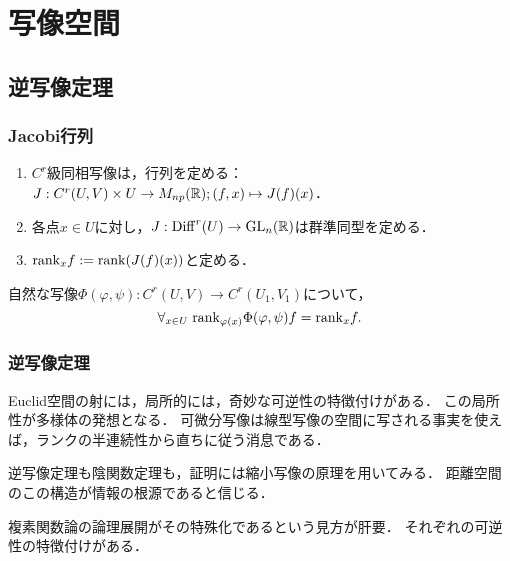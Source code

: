 \documentclass[uplatex,dvipdfmx]{jsreport}
\begin{document}
\chapter{写像空間}

\section{逆写像定理}

\subsection{Jacobi行列}

\begin{definition}[Jacobi行列]\mbox{}
    \begin{enumerate}
        \item $C^r$級同相写像は，行列を定める：$J:C^r(U,V)\times U\to M_{np}(\mathbb{R});(f,x)\mapsto J(f)(x)$．
        \item 各点$x\in U$に対し，$J:\mathrm{Diff}^r(U)\to\mathrm{GL}_n(\mathbb{R})$は群準同型を定める．
        \item $\mathrm{rank}_xf:=\mathrm{rank}(J(f)(x))$と定める．
    \end{enumerate}
\end{definition}

\begin{lemma}
    自然な写像$\Phi(\varphi,\psi):C^r(U,V)\to C^r(U_1,V_1)$について，
    \[\forall_{x\in U}\;\mathrm{rank}_{\varphi(x)}\Phi(\varphi,\psi)f=\mathrm{rank}_xf.\]
\end{lemma}

\subsection{逆写像定理}

\begin{tcolorbox}[colframe=ForestGreen, colback=ForestGreen!10!white,breakable,colbacktitle=ForestGreen!40!white,coltitle=black,fonttitle=\bfseries\sffamily,
title=]
    Euclid空間の射には，局所的には，奇妙な可逆性の特徴付けがある．
    この局所性が多様体の発想となる．
    可微分写像は線型写像の空間に写される事実を使えば，ランクの半連続性から直ちに従う消息である．

    逆写像定理も陰関数定理も，証明には縮小写像の原理を用いてみる．
    距離空間のこの構造が情報の根源であると信じる．

    複素関数論の論理展開がその特殊化であるという見方が肝要．
    それぞれの可逆性の特徴付けがある．
\end{tcolorbox}
\end{document}
